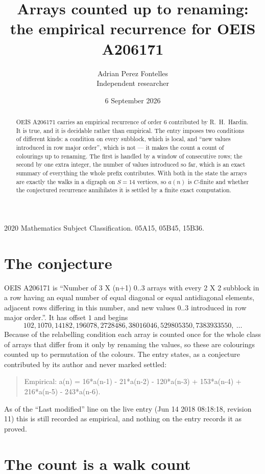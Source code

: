 \documentclass[11pt,a4paper]{article}
\title{Arrays counted up to renaming: the empirical recurrence for OEIS A206171}
\author{Adrian Perez Fontelles\\ \small Independent researcher}
\date{6 September 2026}
\theoremstyle{plain}
\theoremstyle{definition}
\begin{document}
\maketitle

\begin{abstract}
OEIS A206171 carries an empirical recurrence of order $6$ contributed by R.~H.~Hardin. It is
true, and it is decidable rather than empirical. The entry imposes two conditions of different
kinds: a condition on every subblock, which is local, and ``new values introduced in row major
order'', which is not --- it makes the count a count of colourings up to renaming. The first is
handled by a window of consecutive rows; the second by one extra integer, the number of values
introduced so far, which is an exact summary of everything the whole prefix contributes. With
both in the state the arrays are exactly the walks in a digraph on $S=14$ vertices, so $a(n)$
is $C$-finite and whether the conjectured recurrence annihilates it is settled by a finite
exact computation.
\end{abstract}

\noindent\small 2020 Mathematics Subject Classification. 05A15, 05B45, 15B36.\normalsize

\section{The conjecture}

OEIS A206171 is ``Number of 3 X (n+1) 0..3 arrays with every 2 X 2 subblock in a row having an equal number of equal diagonal or equal antidiagonal elements, adjacent rows differing in this number, and new values 0..3 introduced in row major order.''. It has offset $1$ and begins
\[
102, 1070, 14182, 196078, 2728486, 38016046, 529805350, 7383933550,\ \dots
\]
Because of the relabelling condition each array is counted once for the whole class of arrays that differ from it only by renaming the values, so these are colourings counted up to permutation of the colours.
The entry states, as a conjecture contributed by its author and never marked settled:
\begin{quote}
Empirical: a(n) = 16*a(n-1) - 21*a(n-2) - 120*a(n-3) + 153*a(n-4) + 216*a(n-5) - 243*a(n-6).
\end{quote}
As of the ``Last modified'' line on the live entry (Jun 14 2018 08:18:18, revision 11) this is still
recorded as empirical, and nothing on the entry records it as proved.

\section{The count is a walk count}
\end{document}
